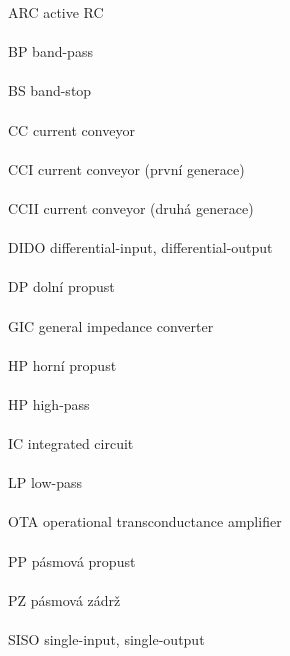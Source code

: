 ARC \hfill active RC \\ \\
BP \hfill band-pass \\ \\
BS \hfill band-stop \\ \\
CC \hfill current conveyor \\ \\
CCI \hfill current conveyor (první generace) \\ \\
CCII \hfill current conveyor (druhá generace) \\ \\
DIDO \hfill differential-input, differential-output \\ \\
DP \hfill dolní propust \\ \\
GIC \hfill general impedance converter \\ \\
HP \hfill horní propust \\ \\
HP \hfill high-pass \\ \\
IC \hfill integrated circuit \\ \\
LP \hfill low-pass \\ \\
OTA \hfill operational transconductance amplifier \\ \\
PP \hfill pásmová propust \\ \\
PZ \hfill pásmová zádrž \\ \\
SISO \hfill single-input, single-output \\ \\
